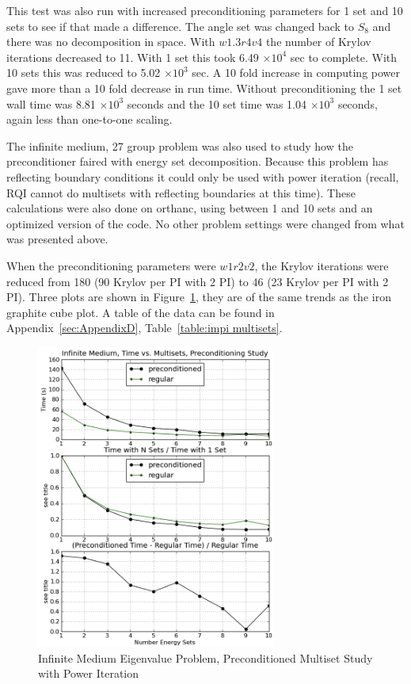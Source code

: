 This test was also run with increased preconditioning parameters for 1 set and 10 sets to see if that made a difference. The angle set was changed back to $S_{8}$ and there was no decomposition in space. With $w1.3r4v4$ the number of Krylov iterations decreased to 11. With 1 set this took 6.49 $\times 10^{4}$ sec to complete. With 10 sets this was reduced to 5.02 $\times 10^{3}$ sec. A 10 fold increase in computing power gave more than a 10 fold decrease in run time. Without preconditioning the 1 set wall time was 8.81 $\times 10^{3}$ seconds and the 10 set time was 1.04 $\times 10^{3}$ seconds, again less than one-to-one scaling.

The infinite medium, 27 group problem was also used to study how the preconditioner faired with energy set decomposition. Because this problem has reflecting boundary conditions it could only be used with power iteration (recall, RQI cannot do multisets with reflecting boundaries at this time). These calculations were also done on orthanc, using between 1 and 10 sets and an optimized version of the code. No other problem settings were changed from what was presented above. 

When the preconditioning parameters were $w1r2v2$, the Krylov iterations were reduced from 180 (90 Krylov per PI with 2 PI) to 46 (23 Krylov per PI with 2 PI). Three plots are shown in Figure~\ref{fig:impi multisets}, they are of the same trends as the iron graphite cube plot. A table of the data can be found in Appendix~\ref{sec:AppendixD}, Table~\ref{table:impi multisets}.
%
\begin{figure}[!ht]
    \begin{center}
      \includegraphics [width=0.7\textwidth, height=0.8\textheight] {impimultisets}
   \end{center}
   \caption{Infinite Medium Eigenvalue Problem, Preconditioned Multiset Study with Power Iteration}
   \label{fig:impi multisets}
\end{figure}

